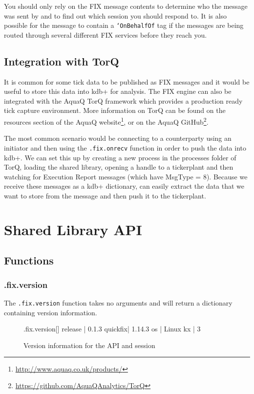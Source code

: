 You should only rely on the FIX message contents to determine who the message was sent by and to find out which session you should respond to. It is also possible for the message to contain
a \texttt{`OnBehalfOf} tag if the messages are being routed through several different
FIX services before they reach you.


\section{Integration with TorQ}

It is common for some tick data to be published as FIX messages and it would be useful to store this
data into kdb+ for analysis. The FIX engine can also be integrated with the AquaQ TorQ framework which provides a production ready tick capture environment. More information on TorQ can be found on the resources section of the AquaQ website\footnote{\url{http://www.aquaq.co.uk/products/}},
 or on the AquaQ GitHub\footnote{\url{https://github.com/AquaQAnalytics/TorQ}}.
 
The most common scenario would be connecting to a counterparty using an initiator and then using the
\texttt{.fix.onrecv} function in order to push the data into kdb+. We can set this up by creating a new process in the processes folder of TorQ, loading the shared library, opening a handle to a tickerplant and then watching for Execution Report messages (which have MsgType = 8). Because we
receive these messages as a kdb+ dictionary, can easily extract the data that we want to store from
the message and then push it to the tickerplant.

\chapter{Shared Library API}
\section{Functions}

\subsection{.fix.version}
\label{func:version}

The \texttt{.fix.version} function takes no arguments and will return a dictionary containing version information.

\begin{figure}[H]
\begin{qcode}
.fix.version[]
release | 0.1.3
quickfix| 1.14.3
os      | Linux
kx      | 3
\end{qcode}
\caption{Version information for the API and session}
\end{figure}

